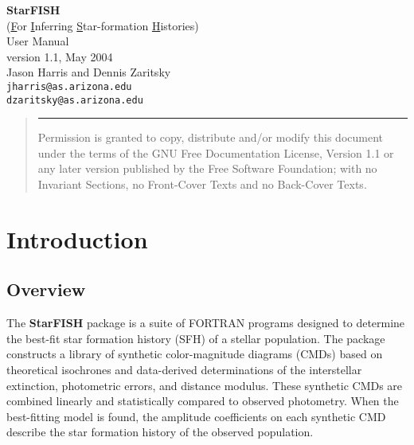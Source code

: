 \documentclass[12pt]{book}
\def\ttb{\tt\color{myBlue}}
\begin{document}
\begin{titlepage}
\begin{center}
\vspace{15em}
{\Huge{\bf StarFISH}} \\
\medskip
(\underline{F}or \underline{I}nferring 
\underline{S}tar-formation \underline{H}istories) \\
\vspace{5em}
{\Huge User Manual} \\
\bigskip
{\large version 1.1, May 2004} \\
\vspace{7em}
{\large Jason Harris and Dennis Zaritsky}\\
{\ttb jharris@as.arizona.edu} \\
{\ttb dzaritsky@as.arizona.edu} \\
\end{center}

\vfill
\begin{quote}
\hrule
Permission is granted to copy, distribute and/or modify this
document under the terms of the GNU Free Documentation License,
Version 1.1 or any later version published by the Free Software
Foundation; with no Invariant Sections, no Front-Cover Texts and
no Back-Cover Texts.
\end{quote}
\end{titlepage}

\tableofcontents



\chapter{Introduction}\label{ch:intro}

\section{Overview}

The {\bf StarFISH} package is a suite of FORTRAN programs designed to 
determine the best-fit star formation history (SFH) of a stellar 
population.  The package constructs a library of synthetic 
color-magnitude diagrams (CMDs) based on theoretical isochrones and 
data-derived determinations of the interstellar extinction, 
photometric errors, and distance modulus.  These synthetic CMDs are 
combined linearly and statistically compared to observed photometry.  
When the best-fitting model is found, the amplitude coefficients on 
each synthetic CMD describe the star formation history of the observed 
population.
\end{document}
